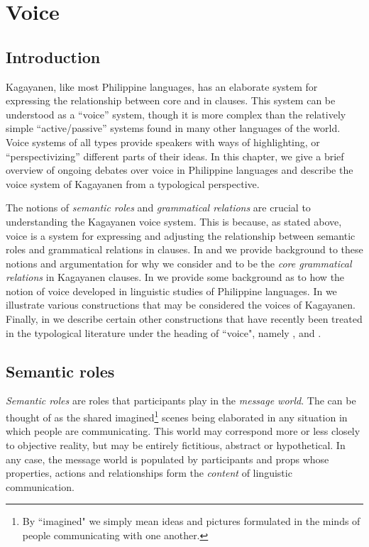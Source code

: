 \chapter{Voice}
\label{chap:voice}
\section{Introduction}
\label{sec:introduction-10}
Kagayanen, like most Philippine languages, has an elaborate system for expressing the relationship between core  and  in clauses. This system can be understood as a “voice” system, though it is more complex than the relatively simple “active/passive” systems found in many other languages of the world. Voice systems of all types provide speakers with ways of highlighting, or “perspectivizing” \citep{fillmore1977} different parts of their ideas. In this chapter, we give a brief overview of ongoing debates over voice in Philippine languages and describe the voice system of Kagayanen from a typological perspective.

The notions of \textit{semantic roles} and \textit{grammatical relations} are crucial to understanding the Kagayanen voice system. This is because, as stated above, voice is a system for expressing and adjusting the relationship between semantic roles and grammatical relations in clauses. In  and  we provide background to these notions and argumentation for why we consider  and  to be the \textit{core grammatical relations} in Kagayanen clauses. In  we provide some background as to how the notion of voice developed in linguistic studies of Philippine languages. In  we illustrate various constructions that may be considered the voices of Kagayanen. Finally, in  we describe certain other constructions that have recently been treated in the typological literature under the heading of ``voice", namely ,  and . 

\section{Semantic roles}
\label{sec:semanticroles}
\textit{Semantic roles} are roles that participants play in the \textit{message world}. The  can be thought of as the shared imagined\footnote{By “imagined" we simply mean ideas and pictures formulated in the minds of people communicating with one another.} scenes being elaborated in any situation in which people are communicating. This world may correspond more or less closely to objective reality, but may be entirely fictitious, abstract or hypothetical. In any case, the message world is populated by participants and props whose properties, actions and relationships form the \textit{content} of linguistic communication. 

